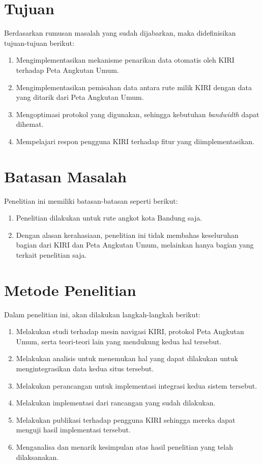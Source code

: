 \section{Tujuan}

Berdasarkan rumusan masalah yang sudah dijabarkan, maka didefinisikan tujuan-tujuan berikut:

\begin{enumerate}
	\item Mengimplementasikan mekanisme penarikan data otomatis oleh KIRI terhadap Peta Angkutan Umum.
	\item Mengimplementasikan pemisahan data antara rute milik KIRI dengan data yang ditarik dari Peta Angkutan Umum.
	\item Mengoptimasi protokol yang digunakan, sehingga kebutuhan \textit{bandwidth} dapat dihemat.
	\item Mempelajari respon pengguna KIRI terhadap fitur yang diimplementasikan.
\end{enumerate}

\section{Batasan Masalah}

Penelitian ini memiliki batasan-batasan seperti berikut:

\begin{enumerate}
	\item Penelitian dilakukan untuk rute angkot kota Bandung saja.
	\item Dengan alasan kerahasiaan, penelitian ini tidak membahas keseluruhan bagian dari KIRI dan Peta Angkutan Umum, melainkan hanya bagian yang terkait penelitian saja.
\end{enumerate}

\section{Metode Penelitian}

Dalam penelitian ini, akan dilakukan langkah-langkah berikut:

\begin{enumerate}
	\item Melakukan studi terhadap mesin navigasi KIRI, protokol Peta Angkutan Umum, serta teori-teori lain yang mendukung kedua hal tersebut.
	\item Melakukan analisis untuk menemukan hal yang dapat dilakukan untuk mengintegrasikan data kedua situs tersebut.
	\item Melakukan perancangan untuk implementasi integrasi kedua sistem tersebut.
	\item Melakukan implementasi dari rancangan yang sudah dilakukan.
	\item Melakukan publikasi terhadap pengguna KIRI sehingga mereka dapat menguji hasil implementasi tersebut.
	\item Menganalisa dan menarik kesimpulan atas hasil penelitian yang telah dilaksanakan.
\end{enumerate}

